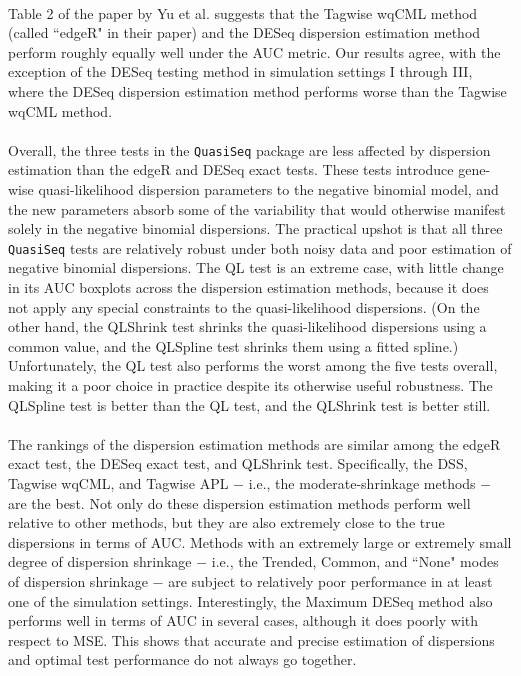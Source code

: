 \documentclass[10pt]{article}
\begin{document}
\paragraph{} \indent Table 2 of the paper by Yu et al. \cite{yu} suggests that the Tagwise wqCML method (called ``edgeR" in their paper) and the DESeq dispersion estimation method perform roughly equally well under the AUC metric. Our results agree, with the exception of the DESeq testing method in simulation settings I through III, where the DESeq dispersion estimation method performs worse than the Tagwise wqCML method. 

\paragraph{} \indent Overall, the three tests in the {\tt QuasiSeq} package are less affected by dispersion estimation than the edgeR and DESeq exact tests. These tests introduce gene-wise quasi-likelihood dispersion parameters to the negative binomial model, and the new parameters absorb some of the variability that would otherwise manifest solely in the negative binomial dispersions. The practical upshot is that all three {\tt QuasiSeq} tests are relatively robust under both noisy data and poor estimation of negative binomial dispersions. The QL test is an extreme case, with little change in its AUC boxplots across the dispersion estimation methods, because it does not apply any special constraints to the quasi-likelihood dispersions. (On the other hand, the QLShrink test shrinks the quasi-likelihood dispersions using a common value, and the QLSpline test shrinks them using a fitted spline.) Unfortunately, the QL test also performs the worst among the five tests overall, making it a poor choice in practice despite its otherwise useful robustness. The QLSpline test is better than the QL test, and the QLShrink test is better still. 

\paragraph{} \indent The rankings of the dispersion estimation methods are similar among the edgeR exact test, the DESeq exact test, and QLShrink test. Specifically, the DSS, Tagwise wqCML, and Tagwise APL $-$ i.e., the moderate-shrinkage methods $-$ are the best. Not only do these dispersion estimation methods perform well relative to other methods, but they are also extremely close to the true dispersions in terms of AUC. Methods with an extremely large or extremely small degree of dispersion shrinkage $-$ i.e., the Trended, Common, and ``None" modes of dispersion shrinkage $-$ are subject to relatively poor performance in at least one of the simulation settings. Interestingly, the Maximum DESeq method also performs well in terms of AUC in several cases, although it does poorly with respect to MSE. This shows that accurate and precise estimation of dispersions and optimal test performance do not always go together.
\end{document}
